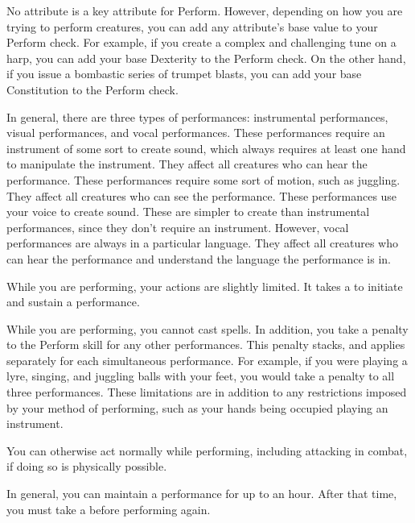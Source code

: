         No attribute is a key attribute for Perform.
        However, depending on how you are trying to perform creatures, you can add any attribute's base value to your Perform check.
        For example, if you create a complex and challenging tune on a harp, you can add your base Dexterity to the Perform check.
        On the other hand, if you issue a bombastic series of trumpet blasts, you can add your base Constitution to the Perform check.

        In general, there are three types of performances: instrumental performances, visual performances, and vocal performances.
         These performances require an instrument of some sort to create sound, which always requires at least one hand to manipulate the instrument.
        They affect all creatures who can hear the performance.
         These performances require some sort of motion, such as juggling.
        They affect all creatures who can see the performance.
         These performances use your voice to create sound.
        These are simpler to create than instrumental performances, since they don't require an instrument.
        However, vocal performances are always in a particular language.
        They affect all creatures who can hear the performance and understand the language the performance is in.

        While you are performing, your actions are slightly limited.
        It takes a  to initiate and sustain a performance.

        While you are performing, you cannot cast spells.
        In addition, you take a  penalty to the Perform skill for any other performances.
        This penalty stacks, and applies separately for each simultaneous performance.
        For example, if you were playing a lyre, singing, and juggling balls with your feet, you would take a  penalty to all three performances.
        These limitations are in addition to any restrictions imposed by your method of performing, such as your hands being occupied playing an instrument.

        You can otherwise act normally while performing, including attacking in combat, if doing so is physically possible.

        In general, you can maintain a performance for up to an hour.
        After that time, you must take a  before performing again.

